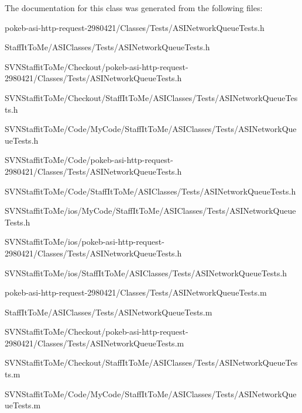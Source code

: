 \-The documentation for this class was generated from the following files\-:\begin{DoxyCompactItemize}
\item 
pokeb-\/asi-\/http-\/request-\/2980421/\-Classes/\-Tests/\-A\-S\-I\-Network\-Queue\-Tests.\-h\item 
\-Staff\-It\-To\-Me/\-A\-S\-I\-Classes/\-Tests/\-A\-S\-I\-Network\-Queue\-Tests.\-h\item 
\-S\-V\-N\-Staffit\-To\-Me/\-Checkout/pokeb-\/asi-\/http-\/request-\/2980421/\-Classes/\-Tests/\-A\-S\-I\-Network\-Queue\-Tests.\-h\item 
\-S\-V\-N\-Staffit\-To\-Me/\-Checkout/\-Staff\-It\-To\-Me/\-A\-S\-I\-Classes/\-Tests/\-A\-S\-I\-Network\-Queue\-Tests.\-h\item 
\-S\-V\-N\-Staffit\-To\-Me/\-Code/\-My\-Code/\-Staff\-It\-To\-Me/\-A\-S\-I\-Classes/\-Tests/\-A\-S\-I\-Network\-Queue\-Tests.\-h\item 
\-S\-V\-N\-Staffit\-To\-Me/\-Code/pokeb-\/asi-\/http-\/request-\/2980421/\-Classes/\-Tests/\-A\-S\-I\-Network\-Queue\-Tests.\-h\item 
\-S\-V\-N\-Staffit\-To\-Me/\-Code/\-Staff\-It\-To\-Me/\-A\-S\-I\-Classes/\-Tests/\-A\-S\-I\-Network\-Queue\-Tests.\-h\item 
\-S\-V\-N\-Staffit\-To\-Me/ios/\-My\-Code/\-Staff\-It\-To\-Me/\-A\-S\-I\-Classes/\-Tests/\-A\-S\-I\-Network\-Queue\-Tests.\-h\item 
\-S\-V\-N\-Staffit\-To\-Me/ios/pokeb-\/asi-\/http-\/request-\/2980421/\-Classes/\-Tests/\-A\-S\-I\-Network\-Queue\-Tests.\-h\item 
\-S\-V\-N\-Staffit\-To\-Me/ios/\-Staff\-It\-To\-Me/\-A\-S\-I\-Classes/\-Tests/\-A\-S\-I\-Network\-Queue\-Tests.\-h\item 
pokeb-\/asi-\/http-\/request-\/2980421/\-Classes/\-Tests/\-A\-S\-I\-Network\-Queue\-Tests.\-m\item 
\-Staff\-It\-To\-Me/\-A\-S\-I\-Classes/\-Tests/\-A\-S\-I\-Network\-Queue\-Tests.\-m\item 
\-S\-V\-N\-Staffit\-To\-Me/\-Checkout/pokeb-\/asi-\/http-\/request-\/2980421/\-Classes/\-Tests/\-A\-S\-I\-Network\-Queue\-Tests.\-m\item 
\-S\-V\-N\-Staffit\-To\-Me/\-Checkout/\-Staff\-It\-To\-Me/\-A\-S\-I\-Classes/\-Tests/\-A\-S\-I\-Network\-Queue\-Tests.\-m\item 
\-S\-V\-N\-Staffit\-To\-Me/\-Code/\-My\-Code/\-Staff\-It\-To\-Me/\-A\-S\-I\-Classes/\-Tests/\-A\-S\-I\-Network\-Queue\-Tests.\-m\item 

\end{DoxyCompactItemize}
